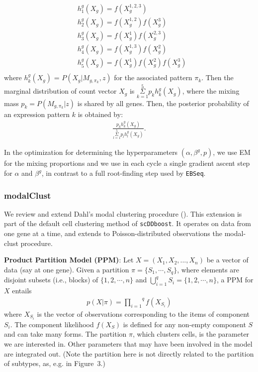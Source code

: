 \documentclass[aoas,preprint]{imsart}
\begin{document}
\begin{align*}
&h_1^{g}(X_g) = f(X_g^{1,2,3})\\
&h_2^{g}(X_g) = f(X_g^{1,2})f(X_g^3)\\
&h_3^{g}(X_g) = f(X_g^1)f(X_g^{2,3})\\
&h_4^{g}(X_g) = f(X_g^{1,3})f(X_g^2)\\
&h_5^{g}(X_g) = f(X_g^1)f(X_g^2)f(X_g^3)\\
\end{align*}
where $h_k^{g}(X_g)$ = $P(X_g | M_{g,\pi_k},z)$ for the  associated pattern $\pi_k$.
Then the marginal distribution of count vector $X_g$ is 
$\overset{5}{\underset{k = 1}{\Sigma}} p_k h_k^{g}(X_g)$, 
where the mixing mass $p_k = P\left(M_{g,\pi_{k}} | z\right)$ is shared by all genes. 
Then, the posterior probability of an expression pattern $k$ is obtained by:
\begin{eqnarray*}
\frac{p_k h^g_k(X_g)}{\overset{5}{\underset{l = 1}{\Sigma}} p_l h_l^{g}(X_g)}.
\end{eqnarray*}


In the optimization for determining the hyperparameters 
$(\alpha, \beta^g, p)$, we use EM for the mixing proportions and
we use in each cycle a single gradient ascent step for $\alpha$ and $\beta^g$, in 
contrast to a full root-finding step used by \verb+EBSeq+. 



\subsubsection*{modalClust}

We review and extend Dahl's modal clustering procedure  (\cite{ref:dahl}).
This extension is part of the default cell clustering method of \verb+scDDboost+.
It operates on data from one gene at a time, and extends to Poisson-distributed observations
the modal-clust procedure.

\noindent
{\bf Product Partition Model (PPM)}:
Let $X = (X_1, X_2, ...,X_n)$ be a vector of data (say at one gene). 
Given a partition $\pi = \{S_1, \cdots, S_q\}$, where elements are disjoint subsets (i.e., blocks)
of $\{1,2,\cdots,n\}$ and $\bigcup_{i = 1}^{q} S_i = \{1,2,\cdots,n\}$, a PPM 
for $X$ entails
\begin{eqnarray*}
p(X|\pi) = \overset{q}{\underset{i = 1}{\prod}}f(X_{S_i})
\end{eqnarray*}
where $X_{S_i}$ is the vector of observations corresponding to the items of component $S_i$. The component likelihood $f(X_{S})$ is defined for any non-empty component $S$ and can take many forms. 
The partition $\pi$, which clusters cells,  is the parameter we are interested in.
Other parameters that may have been involved in the model are integrated out.
(Note the partition here is not directly related to the partition of subtypes, as, e.g. in Figure~3.)
\end{document}
